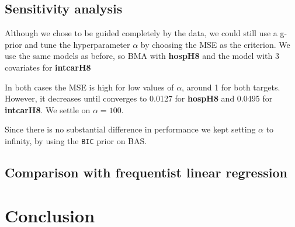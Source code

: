 \documentclass[12pt,a4paper]{article}
\theoremstyle{definition}
\theoremstyle{remark}
\begin{document}
\newpage
\subsection{Sensitivity analysis}
Although we chose to be guided completely by the data,  we could still use a g-prior and tune the hyperparameter $\alpha$ by choosing the MSE as the criterion. We use the same models as before, so BMA with \textbf{hospH8} and the model with 3 covariates for \textbf{intcarH8}

In both cases the MSE is high for low values of $\alpha$, around 1 for both targets. However, it decreases until converges to 0.0127 for \textbf{hospH8} and 0.0495 for \textbf{intcarH8}. We settle on $\alpha = 100$. 

Since there is no substantial difference in performance we kept setting $\alpha$ to infinity, by using the \texttt{BIC} prior on BAS.

\subsection{Comparison with frequentist linear regression}
\newpage
\section{Conclusion}
\end{document}

